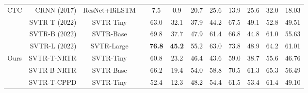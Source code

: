 \documentclass[10pt,journal,compsoc]{IEEEtran}
\begin{document}
\begin{table*}[t]
{\begin{tabular}{c|r|c|c|ccccccc|c}
                      \hline
\multirow{4}{*}{CTC}  & CRNN  \cite{shi2017crnn} (2017)  & ResNet+BiLSTM  &        & 7.5                  & 0.9                                                       & 20.7                 & 25.6                 & 13.9                 & 25.6                                                   & 32.0                 & 18.03                                             \\
                      & SVTR-T \cite{duijcai2022svtr} (2022) & SVTR-Tiny   &       & 63.0                 & 32.1                                                      & 37.9                 & 44.2                 & 67.5                 & 49.1                                                   & 52.8                 & 49.51                                             \\
                      & SVTR-B \cite{duijcai2022svtr} (2022) & SVTR-Base   &       &    69.8                  &   37.7                                                        &  47.9                    &     61.4                 &   66.8                   &   44.8                                                     &  61.0                    & 55.63                                                  \\
                      & SVTR-L \cite{duijcai2022svtr} (2022)  & SVTR-Large   &       &    \textbf{76.8}     &   \textbf{45.2}   &  55.2  &  63.0  &   73.8     &    48.9  & 64.2    &   61.01                                                \\
\hline
\multirow{5}{*}{Ours}  & SVTR-T-NRTR   & SVTR-Tiny   & \multirow{4}{*}{}     & 60.8                 & 23.2                                                      & 46.4                 & 43.6                 & 59.0                 & 38.7                                                   & 55.6                 & 46.76                                             \\
                      & SVTR-B-NRTR   & SVTR-Base  &   & 66.2                 & 19.4                                                      & 54.0                 & 58.8                 & 70.5                 & 61.3                                                   & 65.3                 & 56.49                                             \\
                      & SVTR-T-CPPD   & SVTR-Tiny   &  & 52.4                 & 12.3                                                      & 48.2                 & 54.4                 & 61.5                 & 53.4                                                   & 61.4                 & 49.10                                             \\

\end{tabular}}
\end{table*}
\end{document}
